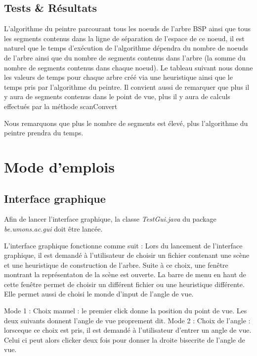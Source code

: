 \documentclass[11pt,a4paper]{article}
\theoremstyle{definition}
\theoremstyle{remark}
\begin{document}
\subsection{Tests \& Résultats}
L'algorithme du peintre parcourant tous les noeuds de l'arbre BSP ainsi que tous les segments contenus dans la ligne de séparation de l'espace de ce noeud, il est naturel que le temps d'exécution de l'algorithme dépendra du nombre de noeuds de l'arbre ainsi que du nombre de segments contenus dans l'arbre (la somme du nombre de segments contenus dans chaque noeud). Le tableau suivant nous donne les valeurs de temps pour chaque arbre créé via une heuristique ainsi que le temps pris par l'algorithme du peintre. Il convient aussi de remarquer que plus il y aura de segments contenus dans le point de vue, plus il y aura de calculs effectués par la méthode scanConvert



Nous remarquons que plus le nombre de segments est élevé, plus l'algorithme du peintre prendra du temps.

\section{Mode d'emplois}

\subsection{Interface graphique}

Afin de lancer l'interface graphique, la classe \textit{TestGui.java} du package \textit{be.umons.ac.gui} doit être lancée. 

L'interface graphique fonctionne comme suit :
Lors du lancement de l'interface graphique, il est demandé à l'utilisateur de choisir un fichier contenant une scène et une heuristique de construction de l'arbre. Suite à ce choix, une fenêtre montrant la représentaton de la scène est ouverte. La barre de menu en haut de cette fenêtre permet de choisir un différent fichier ou une heuristique différente. Elle permet aussi de choisi le monde d'input de l'angle de vue.

Mode 1 : Choix manuel : le premier click donne la position du point de vue. Les deux suivants donnent l'angle de vue proprement dit.
Mode 2 : Choix de l'angle : lorsceque ce choix est pris, il est demandé à l'utilisateur d'entrer un angle de vue. Celui ci peut alors clicker deux fois pour donner la droite bisecrite de l'angle de vue.
\end{document}
